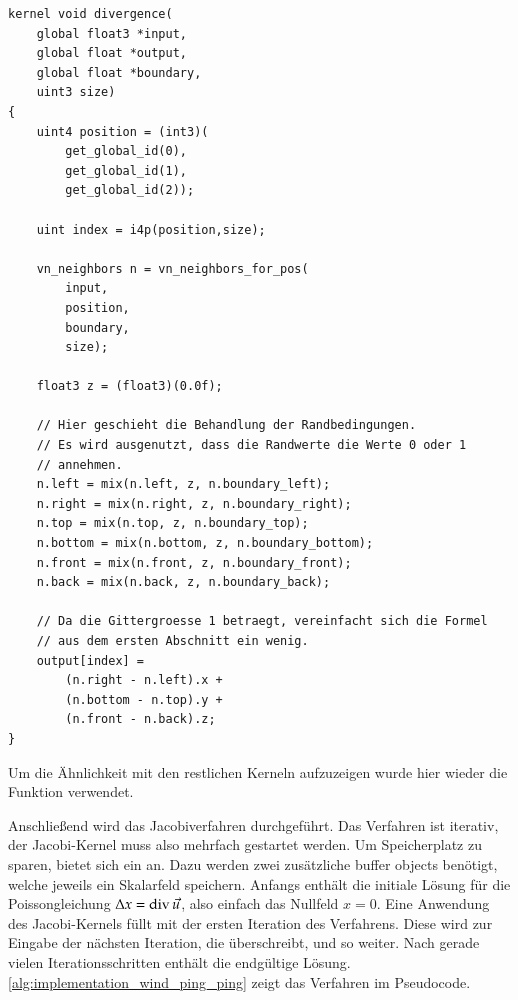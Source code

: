 \begin{verbatim}
kernel void divergence(
    global float3 *input,
    global float *output,
    global float *boundary,
    uint3 size)
{
    uint4 position = (int3)(
        get_global_id(0),
        get_global_id(1),
        get_global_id(2));

    uint index = i4p(position,size);

    vn_neighbors n = vn_neighbors_for_pos(
        input,
        position,
        boundary,
        size);

    float3 z = (float3)(0.0f);

    // Hier geschieht die Behandlung der Randbedingungen.
    // Es wird ausgenutzt, dass die Randwerte die Werte 0 oder 1
    // annehmen.
    n.left = mix(n.left, z, n.boundary_left);
    n.right = mix(n.right, z, n.boundary_right);
    n.top = mix(n.top, z, n.boundary_top);
    n.bottom = mix(n.bottom, z, n.boundary_bottom);
    n.front = mix(n.front, z, n.boundary_front);
    n.back = mix(n.back, z, n.boundary_back);

    // Da die Gittergroesse 1 betraegt, vereinfacht sich die Formel
    // aus dem ersten Abschnitt ein wenig.
    output[index] =
        (n.right - n.left).x +
        (n.bottom - n.top).y +
        (n.front - n.back).z;
}
\end{verbatim}

Um die Ähnlichkeit mit den restlichen Kerneln aufzuzeigen wurde hier
wieder die Funktion  verwendet.

Anschließend wird das Jacobiverfahren durchgeführt. Das
Verfahren ist iterativ, der Jacobi-Kernel muss also mehrfach gestartet
werden. Um Speicherplatz zu sparen, bietet sich ein
 an. Dazu werden zwei zusätzliche
buffer objects  benötigt, welche jeweils ein
Skalarfeld speichern. Anfangs enthält  die
initiale Lösung für die Poissongleichung $\Delta x =
\operatorname*{div} \vec{u}$, also einfach das Nullfeld $x=0$. Eine Anwendung des
Jacobi-Kernels füllt  mit der ersten Iteration
des Verfahrens. Diese wird zur Eingabe der nächsten Iteration, die
 überschreibt, und so weiter. Nach gerade vielen
Iterationsschritten enthält  die endgültige
Lösung. \autoref{alg:implementation_wind_ping_ping} zeigt das
Verfahren im Pseudocode.

